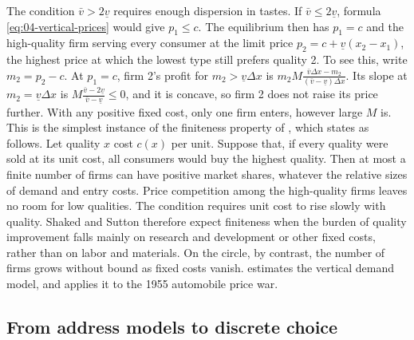 \begin{remark}\label{rem:04-natural-oligopoly}
The condition $\bar v > 2\underline v$ requires enough dispersion in tastes. If $\bar v \le 2\underline v$, formula
\eqref{eq:04-vertical-prices} would give $p_1 \le c$. The equilibrium then has $p_1 = c$ and the high-quality firm
serving every consumer at the limit price $p_2 = c + \underline v(x_2 - x_1)$, the highest price at which the lowest
type still prefers quality 2. To see this, write $m_2 = p_2 - c$. At $p_1 = c$, firm 2's profit for
$m_2 > \underline v\Delta x$ is $m_2M\frac{\bar v\Delta x - m_2}{(\bar v - \underline v)\Delta x}$. Its slope at
$m_2 = \underline v\Delta x$ is $M\frac{\bar v - 2\underline v}{\bar v - \underline v} \le 0$, and it is concave, so firm 2
does not raise its price further. With any positive fixed cost, only one firm enters, however large $M$ is. This is
the simplest instance of the finiteness property of \citet{ShakedSutton1983}, which \citet[Section 7.5.1]{Tirole1988}
states as follows. Let quality $x$ cost $c(x)$ per unit. Suppose that, if every quality were sold at its unit cost,
all consumers would buy the highest quality. Then at most a finite number of firms can have positive market shares,
whatever the relative sizes of demand and entry costs. Price competition among the high-quality firms leaves no room
for low qualities. The condition requires unit cost to rise slowly with quality. Shaked and Sutton therefore expect
finiteness when the burden of quality improvement falls mainly on research and development or other fixed costs,
rather than on labor and materials. On the circle, by contrast, the number of firms grows without bound as fixed
costs vanish.  estimates the vertical demand model, and \citet{Bresnahan1987} applies it to the 1955
automobile price war.
\end{remark}

\subsection{From address models to discrete choice}\label{sec:04-location-bridge}

